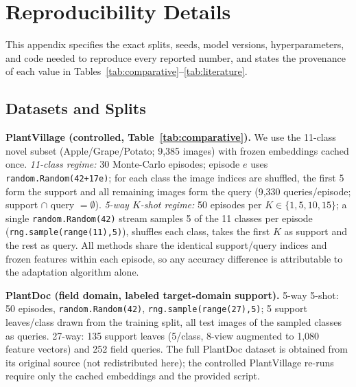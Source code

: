 \documentclass[preprint,12pt]{elsarticle}
\begin{document}
\section{Reproducibility Details}
\label{app:repro}
This appendix specifies the exact splits, seeds, model versions, hyperparameters, and code needed to reproduce every reported number, and states the provenance of each value in Tables~\ref{tab:comparative}--\ref{tab:literature}.

\subsection{Datasets and Splits}
\textbf{PlantVillage (controlled, Table~\ref{tab:comparative}).} We use the 11-class novel subset (Apple/Grape/Potato; 9{,}385 images) with frozen embeddings cached once. \emph{11-class regime:} 30 Monte-Carlo episodes; episode $e$ uses \texttt{random.Random(42+17e)}; for each class the image indices are shuffled, the first 5 form the support and all remaining images form the query (9{,}330 queries/episode; support $\cap$ query $=\emptyset$). \emph{5-way $K$-shot regime:} 50 episodes per $K\in\{1,5,10,15\}$; a single \texttt{random.Random(42)} stream samples 5 of the 11 classes per episode (\texttt{rng.sample(range(11),5)}), shuffles each class, takes the first $K$ as support and the rest as query. All methods share the identical support/query indices and frozen features within each episode, so any accuracy difference is attributable to the adaptation algorithm alone.

\textbf{PlantDoc (field domain, labeled target-domain support).} 5-way 5-shot: 50 episodes, \texttt{random.Random(42)}, \texttt{rng.sample(range(27),5)}; 5 support leaves/class drawn from the training split, all test images of the sampled classes as queries. 27-way: 135 support leaves (5/class, 8-view augmented to 1{,}080 feature vectors) and 252 field queries. The full PlantDoc dataset is obtained from its original source (not redistributed here); the controlled PlantVillage re-runs require only the cached embeddings and the provided script.
\end{document}
